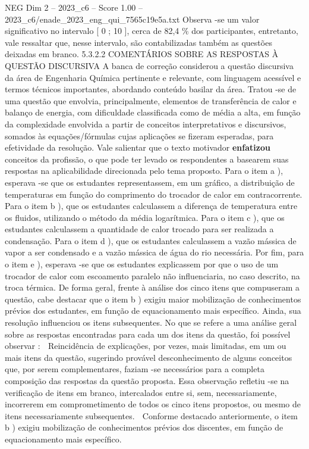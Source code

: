 \begin{textsample}{NEG Dim 2 – 2023\_c6 – Score 1.00 – 2023\_c6/enade\_2023\_eng\_qui\_7565c19e5a.txt}
Observa -se um valor significativo no intervalo [ 0 ; 10 ], cerca de 82,4 \% dos participantes, entretanto, vale ressaltar que, nesse intervalo, são contabilizadas também as questões deixadas em branco. 5.3.2.2 COMENTÁRIOS SOBRE AS RESPOSTAS À QUESTÃO DISCURSIVA A banca de correção considerou a questão discursiva da área de Engenharia Química pertinente e relevante, com linguagem acessível e termos técnicos importantes, abordando conteúdo basilar da área.
Tratou -se de uma questão que envolvia, principalmente, elementos de transferência de calor e balanço de energia, com dificuldade classificada como de média a alta, em função da complexidade envolvida a partir de conceitos interpretativos e discursivos, somados às equações/fórmulas cujas aplicações se fizeram esperadas, para efetividade da resolução.
Vale salientar que o texto motivador \textbf{enfatizou} conceitos da profissão, o que pode ter levado os respondentes a basearem suas respostas na aplicabilidade direcionada pelo tema proposto.
Para o item a ), esperava -se que os estudantes representassem, em um gráfico, a distribuição de temperaturas em função do comprimento do trocador de calor em contracorrente.
Para o item b ), que os estudantes calculassem a diferença de temperatura entre os fluidos, utilizando o método da média logarítmica.
Para o item c ), que os estudantes calculassem a quantidade de calor trocado para ser realizada a condensação.
Para o item d ), que os estudantes calculassem a vazão mássica de vapor a ser condensado e a vazão mássica de água do rio necessária.
Por fim, para o item e ), esperava -se que os estudantes explicassem por que o uso de um trocador de calor com escoamento paralelo não influenciaria, no caso descrito, na troca térmica.
De forma geral, frente à análise dos cinco itens que compuseram a questão, cabe destacar que o item b ) exigiu maior mobilização de conhecimentos prévios dos estudantes, em função de equacionamento mais específico.
Ainda, sua resolução influenciou os itens subsequentes.
No que se refere a uma análise geral sobre as respostas encontradas para cada um dos itens da questão, foi possível observar :  Reincidência de explicações, por vezes, mais limitadas, em um ou mais itens da questão, sugerindo provável desconhecimento de alguns conceitos que, por serem complementares, faziam -se necessários para a completa composição das respostas da questão proposta.
Essa observação refletiu -se na verificação de itens em branco, intercalados entre si, sem, necessariamente, incorrerem em comprometimento de todos os cinco itens propostos, ou mesmo de itens necessariamente subsequentes.  Conforme destacado anteriormente, o item b ) exigiu mobilização de conhecimentos prévios dos discentes, em função de equacionamento mais específico.

\end{textsample}
